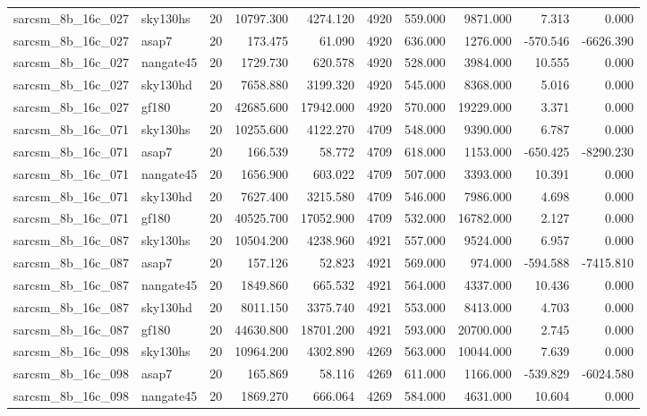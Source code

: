 \documentclass{article}
\begin{document}
\begin{longtable}{llrrrrrrrr}
sarcsm\_8b\_16c\_027 & sky130hs & 20 & 10797.300 & 4274.120 & 4920 & 559.000 & 9871.000 & 7.313 & 0.000 \\
sarcsm\_8b\_16c\_027 & asap7 & 20 & 173.475 & 61.090 & 4920 & 636.000 & 1276.000 & -570.546 & -6626.390 \\
sarcsm\_8b\_16c\_027 & nangate45 & 20 & 1729.730 & 620.578 & 4920 & 528.000 & 3984.000 & 10.555 & 0.000 \\
sarcsm\_8b\_16c\_027 & sky130hd & 20 & 7658.880 & 3199.320 & 4920 & 545.000 & 8368.000 & 5.016 & 0.000 \\
sarcsm\_8b\_16c\_027 & gf180 & 20 & 42685.600 & 17942.000 & 4920 & 570.000 & 19229.000 & 3.371 & 0.000 \\
sarcsm\_8b\_16c\_071 & sky130hs & 20 & 10255.600 & 4122.270 & 4709 & 548.000 & 9390.000 & 6.787 & 0.000 \\
sarcsm\_8b\_16c\_071 & asap7 & 20 & 166.539 & 58.772 & 4709 & 618.000 & 1153.000 & -650.425 & -8290.230 \\
sarcsm\_8b\_16c\_071 & nangate45 & 20 & 1656.900 & 603.022 & 4709 & 507.000 & 3393.000 & 10.391 & 0.000 \\
sarcsm\_8b\_16c\_071 & sky130hd & 20 & 7627.400 & 3215.580 & 4709 & 546.000 & 7986.000 & 4.698 & 0.000 \\
sarcsm\_8b\_16c\_071 & gf180 & 20 & 40525.700 & 17052.900 & 4709 & 532.000 & 16782.000 & 2.127 & 0.000 \\
sarcsm\_8b\_16c\_087 & sky130hs & 20 & 10504.200 & 4238.960 & 4921 & 557.000 & 9524.000 & 6.957 & 0.000 \\
sarcsm\_8b\_16c\_087 & asap7 & 20 & 157.126 & 52.823 & 4921 & 569.000 & 974.000 & -594.588 & -7415.810 \\
sarcsm\_8b\_16c\_087 & nangate45 & 20 & 1849.860 & 665.532 & 4921 & 564.000 & 4337.000 & 10.436 & 0.000 \\
sarcsm\_8b\_16c\_087 & sky130hd & 20 & 8011.150 & 3375.740 & 4921 & 553.000 & 8413.000 & 4.703 & 0.000 \\
sarcsm\_8b\_16c\_087 & gf180 & 20 & 44630.800 & 18701.200 & 4921 & 593.000 & 20700.000 & 2.745 & 0.000 \\
sarcsm\_8b\_16c\_098 & sky130hs & 20 & 10964.200 & 4302.890 & 4269 & 563.000 & 10044.000 & 7.639 & 0.000 \\
sarcsm\_8b\_16c\_098 & asap7 & 20 & 165.869 & 58.116 & 4269 & 611.000 & 1166.000 & -539.829 & -6024.580 \\
sarcsm\_8b\_16c\_098 & nangate45 & 20 & 1869.270 & 666.064 & 4269 & 584.000 & 4631.000 & 10.604 & 0.000 \\

\end{longtable}
\end{document}
